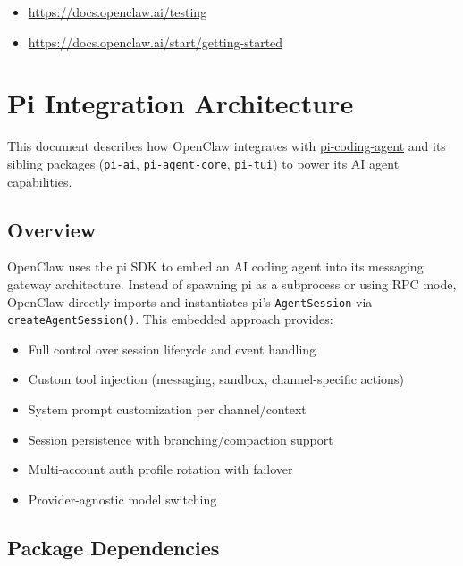 \begin{itemize}
  \item \href{https://docs.openclaw.ai/testing}{https://docs.openclaw.ai/testing}
  \item \href{https://docs.openclaw.ai/start/getting-started}{https://docs.openclaw.ai/start/getting-started}
\end{itemize}



\clearpage

\section{Pi Integration Architecture}


This document describes how OpenClaw integrates with \href{https://github.com/badlogic/pi-mono/tree/main/packages/coding-agent}{pi-coding-agent} and its sibling packages (\texttt{pi-ai}, \texttt{pi-agent-core}, \texttt{pi-tui}) to power its AI agent capabilities.

\subsection{Overview}


OpenClaw uses the pi SDK to embed an AI coding agent into its messaging gateway architecture. Instead of spawning pi as a subprocess or using RPC mode, OpenClaw directly imports and instantiates pi's \texttt{AgentSession} via \texttt{createAgentSession()}. This embedded approach provides:

\begin{itemize}
  \item Full control over session lifecycle and event handling
  \item Custom tool injection (messaging, sandbox, channel-specific actions)
  \item System prompt customization per channel/context
  \item Session persistence with branching/compaction support
  \item Multi-account auth profile rotation with failover
  \item Provider-agnostic model switching
\end{itemize}


\subsection{Package Dependencies}


